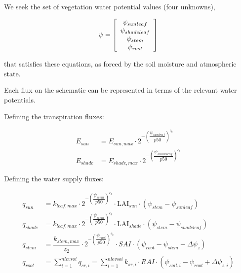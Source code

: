 \documentclass[draft,linenumbers]{agujournal}
\begin{document}
We seek the set of vegetation water potential values (four unknowns), 

   \begin{linenomath*} \begin{equation}
   \psi=\left[ \begin {array}{c} 
   \psi_{sunleaf}\cr\psi_{shadeleaf}\cr\psi_{stem}\cr\psi_{root}
   \end {array} \right] 
   \end{equation} \end{linenomath*}

that satisfies these equations, as forced by the soil moisture and atmospheric state. 

Each flux on the schematic can be represented in terms of the relevant water potentials. 

Defining the transpiration fluxes:


   \begin{linenomath*} \begin{equation}
   \begin{aligned}
   E_{sun} &= E_{sun,max} \cdot 2^{-\left(\dfrac{\psi_{sunleaf}}{p50}\right)^{c_k}} \\
   E_{shade} &= E_{shade,max} \cdot 2^{-\left(\dfrac{\psi_{shadeleaf}}{p50}\right)^{c_k}} 
   \end{aligned}
   \end{equation} \end{linenomath*}

Defining the water supply fluxes:

   \begin{linenomath*} \begin{equation}
   \begin{aligned}
   q_{sun}&=k_{leaf,max}\cdot 2^{-\left(\dfrac{\psi_{stem}}{p50}\right)^{c_k}} \cdot\mbox{LAI}_{sun}\cdot\left(\psi_{stem}-\psi_{sunleaf} \right) \\
   q_{shade}&=k_{leaf,max}\cdot 2^{-\left(\dfrac{\psi_{stem}}{p50}\right)^{c_k}}\cdot\mbox{LAI}_{shade}\cdot\left(\psi_{stem}-\psi_{shadeleaf} \right) \\
   q_{stem}&=\dfrac{k_{stem,max}}{z_2} \cdot 2^{-\left(\dfrac{\psi_{root}}{p50}\right)^{c_k}} \cdot SAI \cdot \left( \psi_{root} - \psi_{stem} - \Delta \psi_z  \right) \\
   q_{root}&=\sum_{i=1}^{nlevsoi}{q_{sr,i}}=\sum_{i=1}^{nlevsoi}{k_{sr,i}\cdot RAI\cdot\left(\psi_{soil,i}-\psi_{root} + \Delta\psi_{z,i} \right)}
   \end{aligned}
   \end{equation} \end{linenomath*}
\end{document}
